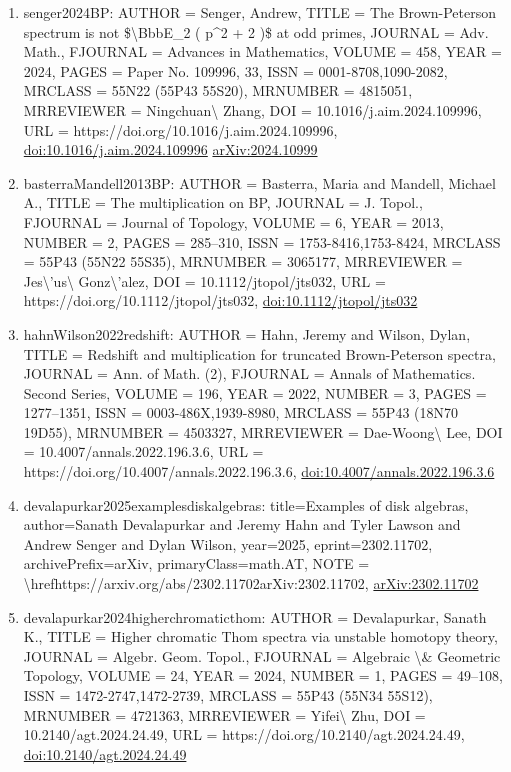 \documentclass[11pt]{article}
\begin{document}
\begin{enumerate}[leftmargin=*]
  \item senger2024BP: AUTHOR = Senger, Andrew, TITLE = The Brown-Peterson spectrum is not \$\textbackslash{}BbbE\_2 ( p\^{}2 + 2 )\$ at odd primes, JOURNAL = Adv. Math., FJOURNAL = Advances in Mathematics, VOLUME = 458, YEAR = 2024, PAGES = Paper No. 109996, 33, ISSN = 0001-8708,1090-2082, MRCLASS = 55N22 (55P43 55S20), MRNUMBER = 4815051, MRREVIEWER = Ningchuan\textbackslash{} Zhang, DOI = 10.1016/j.aim.2024.109996, URL = https://doi.org/10.1016/j.aim.2024.109996, \href{https://doi.org/10.1016/j.aim.2024.109996}{doi:10.1016/j.aim.2024.109996} \href{https://arxiv.org/abs/2024.10999}{arXiv:2024.10999}
  \item basterraMandell2013BP: AUTHOR = Basterra, Maria and Mandell, Michael A., TITLE = The multiplication on BP, JOURNAL = J. Topol., FJOURNAL = Journal of Topology, VOLUME = 6, YEAR = 2013, NUMBER = 2, PAGES = 285--310, ISSN = 1753-8416,1753-8424, MRCLASS = 55P43 (55N22 55S35), MRNUMBER = 3065177, MRREVIEWER = Jes\textbackslash{}'us\textbackslash{} Gonz\textbackslash{}'alez, DOI = 10.1112/jtopol/jts032, URL = https://doi.org/10.1112/jtopol/jts032, \href{https://doi.org/10.1112/jtopol/jts032}{doi:10.1112/jtopol/jts032}
  \item hahnWilson2022redshift: AUTHOR = Hahn, Jeremy and Wilson, Dylan, TITLE = Redshift and multiplication for truncated Brown-Peterson spectra, JOURNAL = Ann. of Math. (2), FJOURNAL = Annals of Mathematics. Second Series, VOLUME = 196, YEAR = 2022, NUMBER = 3, PAGES = 1277--1351, ISSN = 0003-486X,1939-8980, MRCLASS = 55P43 (18N70 19D55), MRNUMBER = 4503327, MRREVIEWER = Dae-Woong\textbackslash{} Lee, DOI = 10.4007/annals.2022.196.3.6, URL = https://doi.org/10.4007/annals.2022.196.3.6, \href{https://doi.org/10.4007/annals.2022.196.3.6}{doi:10.4007/annals.2022.196.3.6}
  \item devalapurkar2025examplesdiskalgebras: title=Examples of disk algebras, author=Sanath Devalapurkar and Jeremy Hahn and Tyler Lawson and Andrew Senger and Dylan Wilson, year=2025, eprint=2302.11702, archivePrefix=arXiv, primaryClass=math.AT, NOTE = \textbackslash{}hrefhttps://arxiv.org/abs/2302.11702arXiv:2302.11702, \href{https://arxiv.org/abs/2302.11702}{arXiv:2302.11702}
  \item devalapurkar2024higherchromaticthom: AUTHOR = Devalapurkar, Sanath K., TITLE = Higher chromatic Thom spectra via unstable homotopy theory, JOURNAL = Algebr. Geom. Topol., FJOURNAL = Algebraic \textbackslash{}\& Geometric Topology, VOLUME = 24, YEAR = 2024, NUMBER = 1, PAGES = 49--108, ISSN = 1472-2747,1472-2739, MRCLASS = 55P43 (55N34 55S12), MRNUMBER = 4721363, MRREVIEWER = Yifei\textbackslash{} Zhu, DOI = 10.2140/agt.2024.24.49, URL = https://doi.org/10.2140/agt.2024.24.49, \href{https://doi.org/10.2140/agt.2024.24.49}{doi:10.2140/agt.2024.24.49}

\end{enumerate}
\end{document}
